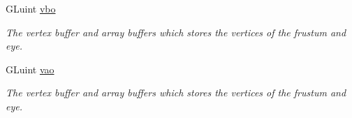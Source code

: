 \begin{DoxyCompactItemize}
\item 
G\+Luint \hyperlink{classcft_1_1Scene_ac7730d3b7bf7fad605b4aa1d665c93f7}{vbo}\hypertarget{classcft_1_1Scene_ac7730d3b7bf7fad605b4aa1d665c93f7}{}\label{classcft_1_1Scene_ac7730d3b7bf7fad605b4aa1d665c93f7}

\begin{DoxyCompactList}\small\item\em The vertex buffer and array buffers which stores the vertices of the frustum and eye. \end{DoxyCompactList}\item 
G\+Luint \hyperlink{classcft_1_1Scene_a4b6ef5cb39ee179dd5f7b547ccdb998c}{vao}\hypertarget{classcft_1_1Scene_a4b6ef5cb39ee179dd5f7b547ccdb998c}{}\label{classcft_1_1Scene_a4b6ef5cb39ee179dd5f7b547ccdb998c}

\begin{DoxyCompactList}\small\item\em The vertex buffer and array buffers which stores the vertices of the frustum and eye. \end{DoxyCompactList}\end{DoxyCompactItemize}

